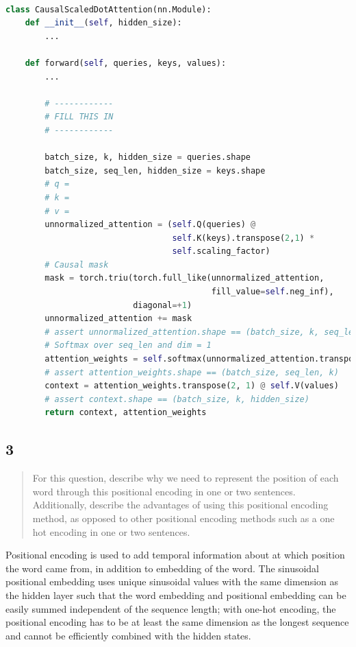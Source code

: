\documentclass{article}
\begin{document}
\begin{lstlisting}[language=Python]
        
class CausalScaledDotAttention(nn.Module):
    def __init__(self, hidden_size):
        ...
    
    def forward(self, queries, keys, values):
        ...

        # ------------
        # FILL THIS IN
        # ------------

        batch_size, k, hidden_size = queries.shape
        batch_size, seq_len, hidden_size = keys.shape
        # q = 
        # k = 
        # v = 
        unnormalized_attention = (self.Q(queries) @ 
                                  self.K(keys).transpose(2,1) * 
                                  self.scaling_factor)
        # Causal mask
        mask = torch.triu(torch.full_like(unnormalized_attention, 
                                          fill_value=self.neg_inf), 
                          diagonal=+1)
        unnormalized_attention += mask
        # assert unnormalized_attention.shape == (batch_size, k, seq_len)
        # Softmax over seq_len and dim = 1
        attention_weights = self.softmax(unnormalized_attention.transpose(2,1))
        # assert attention_weights.shape == (batch_size, seq_len, k)
        context = attention_weights.transpose(2, 1) @ self.V(values)
        # assert context.shape == (batch_size, k, hidden_size)
        return context, attention_weights
\end{lstlisting}

\subsection*{3}

\begin{quote}
For this question, describe why we need to represent the position of each word through this positional encoding in one or two sentences.  Additionally, describe the advantages of using this positional encoding method, as opposed to other positional encoding methods such as a one hot encoding in one or two sentences.
\end{quote}

Positional encoding is used to add temporal information about at which position the word came from, in addition to embedding of the word. The sinusoidal positional embedding uses unique sinusoidal values with the same dimension as the hidden layer such that the word embedding and positional embedding can be easily summed independent of the sequence length; with one-hot encoding, the positional encoding has to be at least the same dimension as the longest sequence and cannot be efficiently combined with the hidden states.
\end{document}
